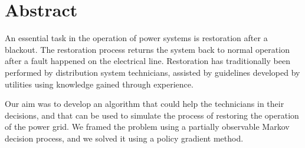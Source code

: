 \chapter*{Abstract}

An essential task in the operation of power systems is restoration after a blackout. The restoration process returns the system back to normal operation after a fault happened on the electrical line. Restoration has traditionally been performed by distribution system technicians, assisted by guidelines developed by utilities using knowledge gained through experience.

Our aim was to develop an algorithm that could help the technicians in their decisions, and that can be used to simulate the process of restoring the operation of the power grid. We framed the problem using a partially observable Markov decision process, and we solved it using a policy gradient method.